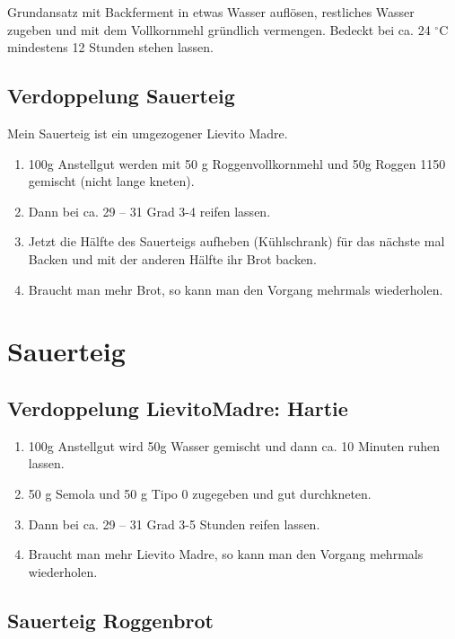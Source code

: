 Grundansatz mit Backferment in etwas Wasser auflösen, restliches Wasser zugeben und mit dem Vollkornmehl gründlich vermengen. Bedeckt bei ca. 24 $^{\circ} $C mindestens 12 Stunden stehen lassen. 

\section{Verdoppelung \Gls{Sauerteig}}\label{sec:Sauerteig}
Mein Sauerteig ist ein umgezogener Lievito Madre.  

\begin{enumerate}
    \item 100\;g Anstellgut werden mit 50\; g Roggenvollkornmehl und 50\;g Roggen 1150 gemischt (nicht lange kneten). 
    \item Dann bei ca. 29 -- 31 Grad 3-4 reifen lassen.
    \item Jetzt die Hälfte des Sauerteigs aufheben (Kühlschrank) für das nächste mal Backen und mit der anderen Hälfte ihr Brot backen.
    \item Braucht man mehr Brot, so kann man den Vorgang mehrmals wiederholen.
\end{enumerate}

\chapter{Sauerteig}

\section{Verdoppelung \Gls{LievitoMadre}: Hartie}\label{sec:Lievito Madre}

\begin{enumerate}
    \item 100\;g Anstellgut wird 50\;g Wasser gemischt und dann ca. 10 Minuten ruhen lassen.  
    \item 50 g Semola und 50 g Tipo 0 zugegeben und gut durchkneten.
    \item Dann bei ca. 29 -- 31 Grad 3-5 Stunden reifen lassen.
    \item Braucht man mehr Lievito Madre, so kann man den Vorgang mehrmals wiederholen.
\end{enumerate}

\section{Sauerteig Roggenbrot} 
